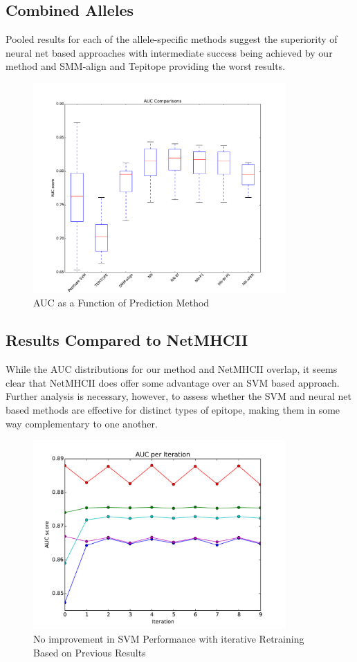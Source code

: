 \documentclass[journal]{IEEEtran}
\begin{document}
\subsection{Combined Alleles}
Pooled results for each of the allele-specific methods suggest the superiority of neural net based approaches with intermediate success being achieved by our method and SMM-align and Tepitope providing the worst results.
\begin{figure}[!h]
\centering
\includegraphics[width=3.8in]{combined}
\caption{AUC as a Function of Prediction Method}
\label{fig_sim}
\end{figure}

\subsection{Results Compared to NetMHCII}
While the AUC distributions for our method and NetMHCII overlap, it seems clear that NetMHCII does offer some advantage over an SVM based approach.  Further analysis is necessary, however, to assess whether the SVM and neural net based methods are effective for distinct types of epitope, making them in some way complementary to one another.


\begin{figure}[!h]
\centering
\includegraphics[width=3.8in]{iterations}
\caption{No improvement in SVM Performance with iterative Retraining Based on Previous Results}
\label{fig_sim}
\end{figure}
\end{document}
